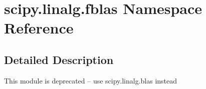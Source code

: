 \hypertarget{namespacescipy_1_1linalg_1_1fblas}{}\section{scipy.\+linalg.\+fblas Namespace Reference}
\label{namespacescipy_1_1linalg_1_1fblas}


\subsection{Detailed Description}
\begin{DoxyVerb}This module is deprecated -- use scipy.linalg.blas instead
\end{DoxyVerb}
 